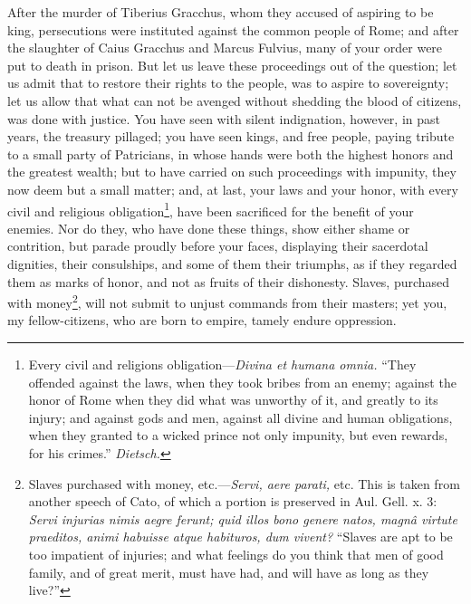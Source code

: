 After the murder of Tiberius Gracchus, whom they accused of aspiring
to be king, persecutions were instituted against the common people of
Rome; and after the slaughter of Caius Gracchus and Marcus Fulvius,
many of your order were put to death in prison. But let us leave these
proceedings out of the question; let us admit that to restore their
rights to the people, was to aspire to sovereignty; let us allow that
what can not be avenged without shedding the blood of citizens, was
done with justice. You have seen with silent indignation, however, in
past years, the treasury pillaged; you have seen kings, and free
people, paying tribute to a small party of Patricians, in whose hands
were both the highest honors and the greatest wealth; but to have
carried on such proceedings with impunity, they now deem but a small
matter; and, at last, your laws and your honor, with every civil and
religious obligation\footnote{Every civil and religions obligation—\emph{Divina et humana omnia.}
``They offended against the laws, when they took bribes from an
enemy; against the honor of Rome when they did what was unworthy of
it, and greatly to its injury; and against gods and men, against all
divine and human obligations, when they granted to a wicked prince not
only impunity, but even rewards, for his crimes.'' \emph{Dietsch.}}, have been sacrificed for the benefit of
your enemies. Nor do they, who have done these things, show either
shame or contrition, but parade proudly before your faces, displaying
their sacerdotal dignities, their consulships, and some of them their
triumphs, as if they regarded them as marks of honor, and not as
fruits of their dishonesty. Slaves, purchased with money\footnote{Slaves purchased with money, etc.—\emph{Servi, aere parati,} etc.
This is taken from another speech of Cato, of which a portion is
preserved in Aul. Gell. x. 3: \emph{Servi injurias nimis aegre ferunt; quid
illos bono genere natos, magnâ virtute praeditos, animi habuisse atque
habituros, dum vivent?} ``Slaves are apt to be too impatient of
injuries; and what feelings do you think that men of good family, and
of great merit, must have had, and will have as long as they live?''}, will
not submit to unjust commands from their masters; yet you, my
fellow-citizens, who are born to empire, tamely endure oppression.

